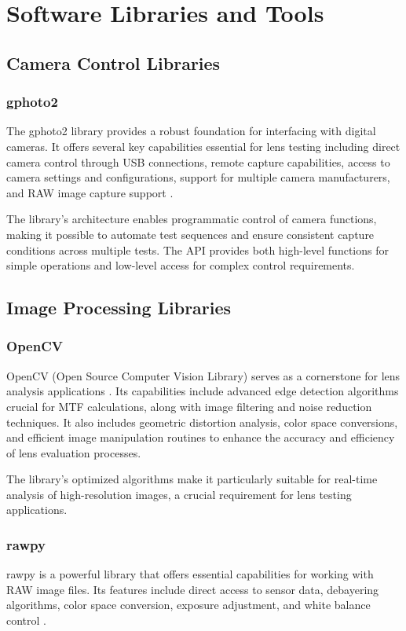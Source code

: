 \section{Software Libraries and Tools}

\subsection{Camera Control Libraries}
\subsubsection{gphoto2}
The gphoto2 library provides a robust foundation for interfacing with digital cameras. It offers several key capabilities essential for lens testing including direct camera control through USB connections, remote capture capabilities, access to camera settings and configurations, support for multiple camera manufacturers, and RAW image capture support \cite{gphoto2}.

The library's architecture enables programmatic control of camera functions, making it possible to automate test sequences and ensure consistent capture conditions across multiple tests. The API provides both high-level functions for simple operations and low-level access for complex control requirements.

\subsection{Image Processing Libraries}
\subsubsection{OpenCV}
OpenCV (Open Source Computer Vision Library) serves as a cornerstone for lens analysis applications \cite{opencv}. Its capabilities include advanced edge detection algorithms crucial for MTF calculations, along with image filtering and noise reduction techniques. It also includes geometric distortion analysis, color space conversions, and efficient image manipulation routines to enhance the accuracy and efficiency of lens evaluation processes.

The library's optimized algorithms make it particularly suitable for real-time analysis of high-resolution images, a crucial requirement for lens testing applications.

\subsubsection{rawpy}
rawpy is a powerful library that offers essential capabilities for working with RAW image files. Its features include direct access to sensor data, debayering algorithms, color space conversion, exposure adjustment, and white balance control \cite{rawpy}.

